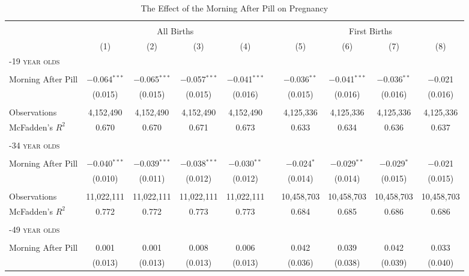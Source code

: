 \begin{landscape}
\begin{table}[!htbp] \centering
\caption{The Effect of the Morning After Pill on Pregnancy}
\label{TEENtab:PillPreg}
\begin{tabular}{@{\extracolsep{5pt}}lccccp{1mm}cccc}
\\[-1.8ex]\hline \hline \\[-1.8ex] 
&\multicolumn{4}{c}{All Births}&&\multicolumn{4}{c}{First Births}
\\ \cmidrule(r){2-5} \cmidrule(r){7-10}
&(1)&(2)&(3)&(4)&&(5)&(6)&(7)&(8)\\ \hline
\multicolumn{10}{l}{\textsc{\noindent 15-19 year olds}} \\
 & & & & & & & & & \\
Morning After Pill &$-$0.064$^{***}$&$-$0.065$^{***}$&$-$0.057$^{***}$&$-$0.041$^{***}$&&$-$0.036$^{**}$&$-$0.041$^{***}$&$-$0.036$^{**}$&$-$0.021\\
 &(0.015)&(0.015)&(0.015)&(0.016)&&(0.015)&(0.016)&(0.016)&(0.016)\\
 & & & & & & & & & \\
Observations&4,152,490&4,152,490&4,152,490&4,152,490&&4,125,336&4,125,336&4,125,336&4,125,336\\
McFadden's $R^2$&0.670&0.670&0.671&0.673&&0.633&0.634&0.636&0.637\\
 & & & & & & & & & \\
\multicolumn{10}{l}{\textsc{\noindent 20-34 year olds}} \\
 & & & & & & & & & \\
Morning After Pill &$-$0.040$^{***}$&$-$0.039$^{***}$&$-$0.038$^{***}$&$-$0.030$^{**}$&&$-$0.024$^{*}$&$-$0.029$^{**}$&$-$0.029$^{*}$&$-$0.021\\
 &(0.010)&(0.011)&(0.012)&(0.012)&&(0.014)&(0.014)&(0.015)&(0.015)\\
 & & & & & & & & & \\
Observations&11,022,111&11,022,111&11,022,111&11,022,111&&10,458,703&10,458,703&10,458,703&10,458,703\\
McFadden's $R^2$&0.772&0.772&0.773&0.773&&0.684&0.685&0.686&0.686\\
 & & & & & & & & & \\
\multicolumn{10}{l}{\textsc{\noindent 35-49 year olds}} \\
 & & & & & & & & & \\
Morning After Pill &0.001&0.001&0.008&0.006&&0.042&0.039&0.042&0.033\\
 &(0.013)&(0.013)&(0.013)&(0.013)&&(0.036)&(0.038)&(0.039)&(0.040)\\

\end{tabular}
\end{table}
\end{landscape}

